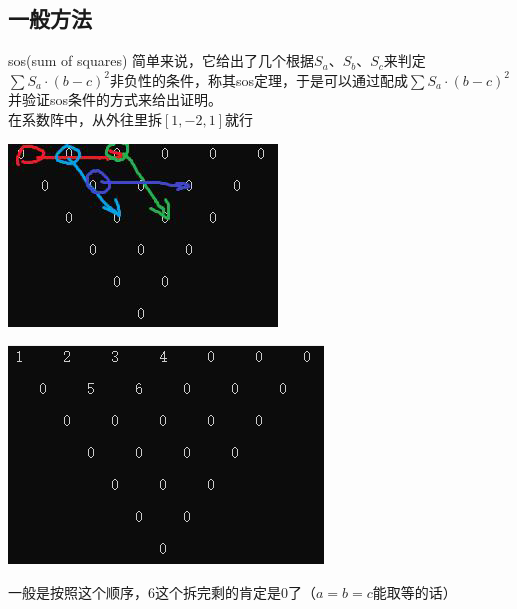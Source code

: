 \documentclass[UTF8]{ctexart}
\begin{document}
\subsection{一般方法}
sos(sum of squares)
简单来说，它给出了几个根据$ S_{a} $、$ S_{b} $、$ S_{c} $来判定$ \displaystyle \sum S_{a}·(b-c)^{2} $非负性的条件，称其sos定理，于是可以通过配成$ \displaystyle \sum S_{a}·(b-c)^{2} $并验证sos条件的方式来给出证明。\\
在系数阵中，从外往里拆$ [1,-2,1] $就行
\begin{center}
	\includegraphics[width=0.4\linewidth]{0380}
\end{center}
\begin{center}
	\includegraphics[width=0.4\linewidth]{0381}
\end{center}
一般是按照这个顺序，$ 6 $这个拆完剩的肯定是$ 0 $了（$ a=b=c $能取等的话）
\end{document}
